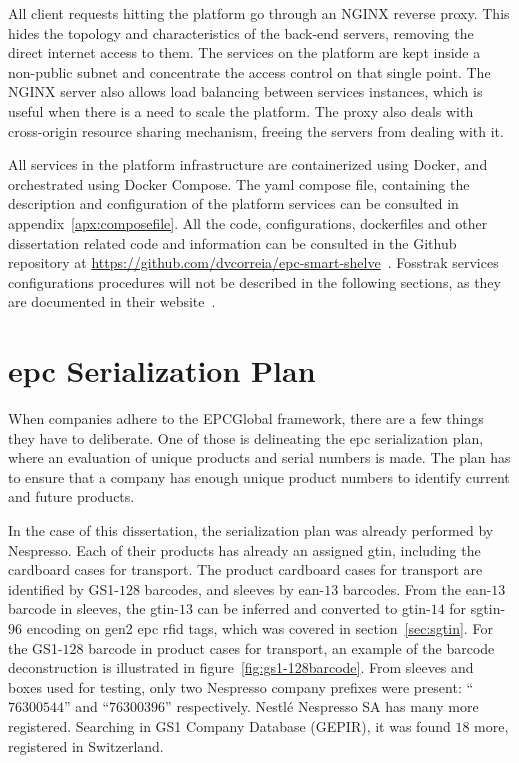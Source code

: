 All client requests hitting the platform go through an NGINX reverse proxy. This hides the topology and characteristics of the back-end servers, removing the direct internet access to them. The services on the platform are kept inside a non-public subnet and concentrate the access control on that single point. The NGINX server also allows load balancing between services instances, which is useful when there is a need to scale the platform. The proxy also deals with cross-origin resource sharing mechanism, freeing the servers from dealing with it.

All services in the platform infrastructure are containerized using Docker, and orchestrated using Docker Compose. The yaml compose file, containing the description and configuration of the platform services can be consulted in appendix~\ref{apx:composefile}.
All the code, configurations, dockerfiles and other dissertation related code and information can be consulted in the Github repository at \url{https://github.com/dvcorreia/epc-smart-shelve}~\cite{DvcorreiaEpcsmartshelve}.
Fosstrak services configurations procedures will not be described in the following sections, as they are documented in their website~\cite{FosstrakWelcome}.

\section{\acs{epc} Serialization Plan}

When companies adhere to the EPCGlobal framework, there are a few things they have to deliberate.
One of those is delineating the \acs{epc} serialization plan, where an evaluation of unique products and serial numbers is made.
The plan has to ensure that a company has enough unique product numbers to identify current and future products.

In the case of this dissertation, the serialization plan was already performed by Nespresso.
Each of their products has already an assigned \ac{gtin}, including the cardboard cases for transport.
The product cardboard cases for transport are identified by GS1-$128$ barcodes, and sleeves by \acs{ean}-$13$ barcodes.
From the \acs{ean}-$13$ barcode in sleeves, the \acs{gtin}-$13$ can be inferred and converted to \acs{gtin}-$14$ for \ac{sgtin}-$96$ encoding on \ac{gen2} \ac{epc} \acs{rfid} tags, which was covered in section~\ref{sec:sgtin}.
For the GS1-$128$ barcode in product cases for transport, an example of the barcode deconstruction is illustrated in figure~\ref{fig:gs1-128barcode}.
From sleeves and boxes used for testing, only two Nespresso company prefixes were present: ``$76300544$'' and ``$76300396$'' respectively. Nestlé Nespresso SA has many more registered. Searching in GS1 Company Database (GEPIR), it was found $18$ more, registered in Switzerland.

